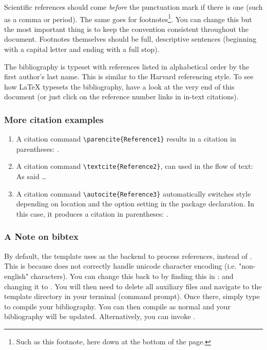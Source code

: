 Scientific references should come \emph{before} the punctuation mark if there is one (such as a comma or period). The same goes for footnotes\footnote{Such as this footnote, here down at the bottom of the page.}. You can change this but the most important thing is to keep the convention consistent throughout the document. Footnotes themselves should be full, descriptive sentences (beginning with a capital letter and ending with a full stop). 

The bibliography is typeset with references listed in alphabetical order by the first author's last name. This is similar to the Harvard referencing style. To see how \LaTeX{} typesets the bibliography, have a look at the very end of this document (or just click on the reference number links in in-text citations).

\subsubsection*{More citation examples}

\begin{enumerate} \item A citation command \verb!\parencite{Reference1}! results in a citation in parentheses: \parencite{Reference1}. 
\item A citation command \verb!\textcite{Reference2}!, can used in the flow of text: As \textcite{Reference2} said \dots 
\item A citation command \verb!\autocite{Reference3}! automatically switches style depending on location and the option setting in the package declaration. In this case, it produces a citation in parentheses: \autocite{Reference3}. \end{enumerate}

\subsubsection*{A Note on bibtex}

By default, the template uses  as the backend to process references, instead of . This is because  does not correctly handle unicode character encoding (i.e. "non-english" characters). You can change this back to   by finding this in :  and changing it to . You will then need to delete all auxiliary files and navigate to the template directory in your terminal (command prompt). Once there, simply type  to compile your bibliography. You can then compile  as normal and your bibliography will be updated. Alternatively, you can invoke .

